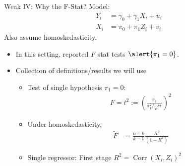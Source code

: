 \documentclass[aspectratio=169, handout]{beamer}
\newcommand{\Cov}{\operatorname{Cov}}
\newcommand{\Corr}{\operatorname{Corr}}
\begin{document}
{\footnotesize
\begin{frame}{Weak IV: Why the F-Stat?}
\alert{Model}:
\begin{align*}
  Y_i &= \gamma_0 + \gamma_1 X_i + u_i
  \\
  X_i &= \pi_0 + \pi_1 Z_i + v_i
\end{align*}
Also assume homoskedasticity.
\begin{itemize}
  \item In this setting, reported $F$ stat tests $\alert{\pi_1=0}$.
  \item Collection of definitions/results we will use
    \begin{itemize}
      \item Test of single hypothesis $\pi_1=0$:
        \begin{align*}
          F
          =
          t^2
          :=
          \left(
          \frac{\hat{\pi}_1}{\sigma^2_{1}/\sqrt{n}}
          \right)^2
        \end{align*}
      \item Under homoskedasticity,
        \begin{align*}
          \tilde{F}
          &=
          \frac{n-k}{k-1}
          \frac{R^2}{(1-R^2)}
        \end{align*}
      \item Single regressor:
        First stage $R^2=\Corr(X_i,Z_i)^2$
    \end{itemize}
\end{itemize}
\end{frame}
}
\end{document}

